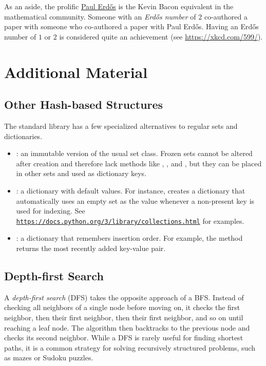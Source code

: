 As an aside, the prolific \href{https://en.wikipedia.org/wiki/Erd%C5%91s_number}{Paul Erd\H{o}s} is the Kevin Bacon equivalent in the mathematical community.
Someone with an \emph{Erd\H{o}s number} of $2$ co-authored a paper with someone who co-authored a paper with Paul Erd\H{o}s.
Having an Erd\H{o}s number of $1$ or $2$ is considered quite an achievement (see \url{https://xkcd.com/599/}).

\newpage

\section*{Additional Material} %

\subsection*{Other Hash-based Structures} %

The standard library has a few specialized alternatives to regular sets and dictionaries.
\begin{itemize}
\item {}: an immutable version of the usual set class.
Frozen sets cannot be altered after creation and therefore lack methods like , , and , but they can be placed in other sets and used as dictionary keys.

\item {}: a dictionary with default values.
For instance,  creates a dictionary that automatically uses an empty set as the value whenever a non-present key is used for indexing.
See \href{https://docs.python.org/3/library/collections.html\#defaultdict-examples}{\texttt{https://docs.python.org/3/library/collections.html}} for examples.

\item {}: a dictionary that remembers insertion order.
For example, the  method returns the most recently added key-value pair.
\end{itemize}

\subsection*{Depth-first Search} %

A \emph{depth-first search} (DFS) takes the opposite approach of a BFS.
Instead of checking all neighbors of a single node before moving on, it checks the first neighbor, then their first neighbor, then their first neighbor, and so on until reaching a leaf node.
The algorithm then backtracks to the previous node and checks its second neighbor.
While a DFS is rarely useful for finding shortest paths, it is a common strategy for solving recursively structured problems, such as mazes or Sudoku puzzles.

